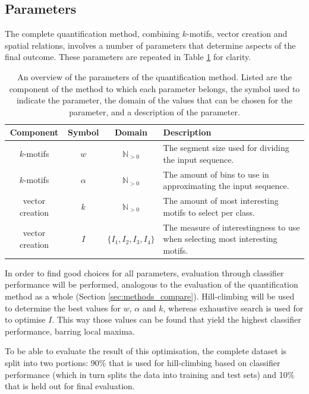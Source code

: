 \documentclass[conference,a4paper,twoside]{IEEEtran}
\begin{document}
\subsection{Parameters}
\label{sec:methods_params}

The complete quantification method, combining $k$-motifs, vector creation and spatial relations, involves a number of parameters that determine aspects of the final outcome. These parameters are repeated in Table \ref{tab:params} for clarity.

\begin{table}
    \centering
    \caption{An overview of the parameters of the quantification method. Listed are the component of the method to which each parameter belongs, the symbol used to indicate the parameter, the domain of the values that can be chosen for the parameter, and a description of the parameter.}
    \begin{tabular}{cccl}
    Component & Symbol & Domain & Description \\\hline
    $k$-motifs & $w$ & $\mathbb{N}_{>0}$ & The segment size used for dividing the input sequence. \\
    $k$-motifs & $\alpha$ & $\mathbb{N}_{>0}$ &  The amount of bins to use in approximating the input sequence. \\
    vector creation & $k$ & $\mathbb{N}_{>0}$ & The amount of most interesting motifs to select per class. \\
    vector creation & $I$ & $\{ I_1, I_2, I_3, I_4 \}$ & The measure of interestingness to use when selecting most interesting motifs. \\
    \end{tabular}
    \label{tab:params}
\end{table}

In order to find good choices for all parameters, evaluation through classifier performance will be performed, analogous to the evaluation of the quantification method as a whole (Section \ref{sec:methods_compare}). Hill-climbing will be used to determine the best values for $w$, $\alpha$ and $k$, whereas exhaustive search is used for to optimise $I$. This way those values can be found that yield the highest classifier performance, barring local maxima.

To be able to evaluate the result of this optimisation, the complete dataset is split into two portions: 90\% that is used for hill-climbing based on classifier performance (which in turn splits the data into training and test sets) and 10\% that is held out for final evaluation.
\end{document}
